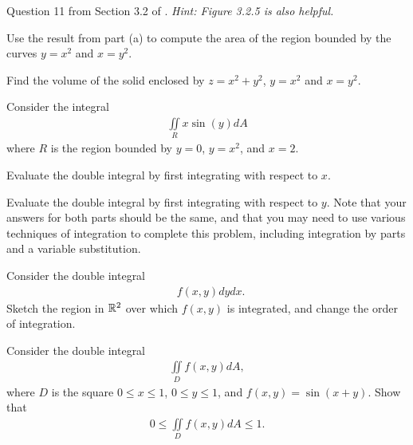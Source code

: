 \item  %
\BEN
\item Question 11 from Section 3.2 of \VCT. \textit{Hint: Figure 3.2.5 is also helpful.}
\item Use the result from part (a) to compute the area of the region bounded by the curves $y = x^2$ and $x=y^2$.
\EEN

\item %
Find the volume of the solid enclosed by $z = x^2 + y^2$, $y = x^2$ and $x=y^2$.
\item %
Consider the integral
\begin{align*}
  \iint\limits_R x\sin(y) dA
\end{align*}
 where $R$ is the region bounded by $y=0$, $y=x^2$, and $x=2$.
\BEN
\item Evaluate the double integral by first integrating with respect to $x$. 
\item Evaluate the double integral by first integrating with respect to $y$. 
\EEN
Note that your answers for both parts should be the same, and that you may need to use various techniques of integration to complete this problem, including integration by parts and a variable substitution. 
\item %
Consider the double integral
\begin{align*}
  \mathop{\int_{0}^{1+e} \! \int_0^{\ln(x-1)}} f(x,y) dydx .
\end{align*}
Sketch the region in $\mathbb{R}^2$ over which $f(x,y)$ is integrated, and change the order of integration.  
\item %
Consider the double integral
\begin{align*}
  \iint\limits_D f(x,y) dA,
\end{align*}
where $D$ is the square $0\le x \le 1$, $0\le y \le 1$, and $f(x,y) = \sin(x+y)$. Show that 
\begin{align*}
  0 \le \iint\limits_D f(x,y) dA \le 1.
\end{align*}
